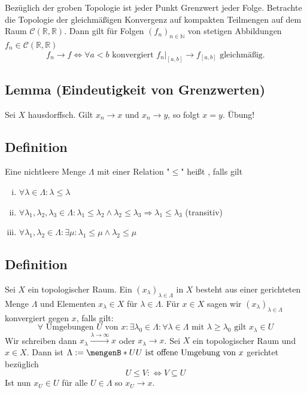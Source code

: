 Bezüglich der groben Topologie ist jeder Punkt Grenzwert jeder Folge.
Betrachte die Topologie der gleichmäßigen Konvergenz auf kompakten Teilmengen auf dem Raum $\mathcal{C}(\mathds{R},\mathds{R})$. Dann gilt für Folgen 
$(f_n)_{n \in \mathds{N} }$ von stetigen Abbildungen $f_n \in \mathcal{C}(\mathds{R},\mathds{R}) $
\[
	f_n \to f \iff \forall a < b \text{ konvergiert } f_n|_{[a,b]} \to f_{[a,b]} \text{ gleichmäßig.}
\]

\subsection{Lemma (Eindeutigkeit von Grenzwerten)} %
\label{sub:32}
Sei $X$ hausdorffsch. Gilt $x_n \to x$ und $x_n \to y$, so folgt $x=y$.
Übung!

\subsection[Definition: Gerichtete Menge]{Definition} %
\label{sub:33}
Eine nichtleere Menge $\Lambda $ mit einer Relation "$\le$"{} heißt , falls gilt 
\begin{enumerate}[(i)]
	\item $\forall \lambda  \in \Lambda : \lambda  \le \lambda $
	\item $\forall \lambda_1, \lambda_2, \lambda_3 \in \Lambda  : \lambda_1 \le \lambda_2 \wedge \lambda_2 \le \lambda_3 \Rightarrow \lambda_1 \le \lambda_3$
	\hfill (transitiv)
	\item $\forall \lambda_1, \lambda_2 \in \Lambda : \exists \mu : \lambda_1 \le \mu \wedge \lambda_2 \le \mu$
\end{enumerate} 

\subsection[Definition: Netz und Konvergenz bezüglich eines Netzes]{Definition} %
\label{sub:34}
Sei $X$ ein topologischer Raum. Ein  $(x_\lambda)_{\lambda \in \Lambda }$ in $X$ besteht aus einer gerichteten Menge $\Lambda $ und Elementen 
$x_\lambda \in X$ für $\lambda \in \Lambda $. Für $x \in X$ sagen wir $(x_\lambda )_{\lambda \in \Lambda }$ konvergiert gegen $x$, falls gilt:
\[
	\forall \text{ Umgebungen } U \text{ von } x : \exists \lambda_0 \in \Lambda : \forall \lambda \in \Lambda \text{ mit } 
	\lambda \ge \lambda_0 \text{ gilt } x_\lambda \in U
\]
Wir schreiben dann $x_\lambda \xrightarrow{\lambda  \to \infty} x$ oder $x_\lambda \to x$.
Sei $X$ ein topologischer Raum und $x \in X$. Dann ist $\Lambda := \set[U]{U \text{ ist offene Umgebung von }x} $ gerichtet bezüglich
\[
	U \le V :\Leftrightarrow V \subseteq U
\]
Ist nun $x_U \in U$ für alle $U \in \Lambda $ so $x_U \to x$.

